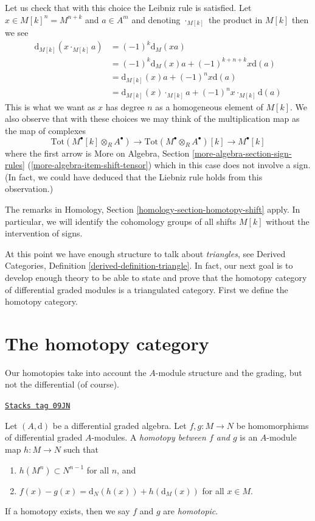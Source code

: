 Let us check that with this choice the Leibniz rule is satisfied.
Let $x \in M[k]^n = M^{n + k}$ and $a \in A^m$ and denoting
$\cdot_{M[k]}$ the product in $M[k]$ then we see
\begin{align*}
\text{d}_{M[k]}(x \cdot_{M[k]} a)
& =
(-1)^k \text{d}_M(xa) \\
& =
(-1)^k \text{d}_M(x) a + (-1)^{k + n + k} x \text{d}(a) \\
& =
\text{d}_{M[k]}(x) a + (-1)^n x \text{d}(a) \\
& =
\text{d}_{M[k]}(x) \cdot_{M[k]} a + (-1)^n x \cdot_{M[k]} \text{d}(a)
\end{align*}
This is what we want as $x$ has degree $n$ as a homogeneous element of $M[k]$.
We also observe that with these choices we may think of
the multiplication map as the map of complexes
$$
\text{Tot}(M^\bullet[k] \otimes _R A^\bullet) \to
\text{Tot}(M^\bullet \otimes _R A^\bullet)[k] \to
M^\bullet[k]
$$
where the first arrow is
More on Algebra, Section \ref{more-algebra-section-sign-rules}
(\ref{more-algebra-item-shift-tensor}) which in this
case does not involve a sign. (In fact, we could have deduced
that the Liebniz rule holds from this observation.)

\medskip\noindent
The remarks in Homology, Section \ref{homology-section-homotopy-shift} apply.
In particular, we will identify the cohomology groups of all shifts
$M[k]$ without the intervention of signs.

\medskip\noindent
At this point we have enough structure to talk about {\it triangles},
see Derived Categories, Definition \ref{derived-definition-triangle}.
In fact, our next goal is to develop enough theory to be able to
state and prove that the homotopy category of differential graded
modules is a triangulated category. First we define the homotopy category.

\section{The homotopy category}
\label{dga-section-homotopy}
Our homotopies take into account the $A$-module structure and the
grading, but not the differential (of course).

\begin{definition}[Homotopy]
\label{dga-definition-homotopy}
\href{https://stacks.math.columbia.edu/tag/09JN}{\texttt{Stacks tag 09JN}}

Let $(A, \text{d})$ be a differential graded algebra. Let
$f, g : M \to N$ be homomorphisms of differential graded $A$-modules.
A {\it homotopy between $f$ and $g$} is an $A$-module map $h : M \to N$
such that
\begin{enumerate}
\item $h(M^n) \subset N^{n - 1}$ for all $n$, and
\item $f(x) - g(x) = \text{d}_N(h(x)) + h(\text{d}_M(x))$ for
all $x \in M$.
\end{enumerate}
If a homotopy exists, then we say $f$ and $g$ are {\it homotopic}.
\end{definition}

